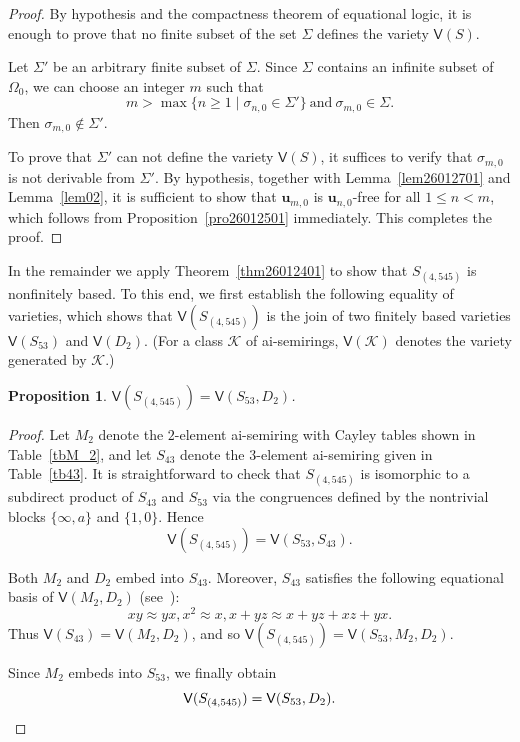 \documentclass[reqno]{amsart}
\theoremstyle{plain}
\newtheorem{pro}[thm]{Proposition}
\theoremstyle{definition}
\newcommand{\bu}{\mathbf{u}}
\begin{document}
\begin{proof}
By hypothesis and the compactness theorem of equational logic,
it is enough to prove that no finite subset of the set $\Sigma$ defines the variety $\mathsf{V}(S)$.

Let $\Sigma'$ be an arbitrary finite subset of $\Sigma$.
Since $\Sigma$ contains an infinite subset of $\Omega_0$, we can choose an integer $m$ such that
\[
m>\max\{n\geq 1 \mid \sigma_{n, 0}\in \Sigma'\}~ \text{and} ~\sigma_{m, 0}\in\Sigma.
\]
Then $\sigma_{m, 0}\notin\Sigma'$.

To prove that $\Sigma'$ can not define the variety $\mathsf{V}(S)$,
it suffices to verify that $\sigma_{m, 0}$ is not derivable from $\Sigma'$.
By hypothesis, together with Lemma~\ref{lem26012701} and Lemma~\ref{lem02},
it is sufficient to show that $\bu_{m, 0}$ is $\bu_{n, 0}$-free for all $1 \leq n<m$,
which follows from Proposition~\ref{pro26012501} immediately.
This completes the proof.
\end{proof}

In the remainder we apply Theorem~\ref{thm26012401} to show that $S_{(4, 545)}$ is nonfinitely based.
To this end, we first establish the following equality of varieties,
which shows that $\mathsf{V}(S_{(4, 545)})$ is the join of two finitely based varieties
$\mathsf{V}(S_{53})$ and $\mathsf{V}(D_2)$.
(For a class $\mathcal{K}$ of ai-semirings,
$\mathsf{V}(\mathcal{K})$ denotes the variety generated by $\mathcal{K}$.)

\begin{pro}\label{pro26011401}
$\mathsf{V}(S_{(4, 545)})=\mathsf{V}(S_{53}, D_2)$.
\end{pro}
\begin{proof}
Let $M_2$ denote the $2$-element ai-semiring with Cayley tables shown in Table~\ref{tbM_2},
and let $S_{43}$ denote the $3$-element ai-semiring given in Table~\ref{tb43}.
It is straightforward to check that $S_{(4, 545)}$ is isomorphic to a subdirect product of $S_{43}$ and $S_{53}$
via the congruences defined by the nontrivial blocks $\{\infty, a\}$ and $\{1, 0\}$.
Hence
\[
\mathsf{V}(S_{(4, 545)}) = \mathsf{V}(S_{53}, S_{43}).
\]

Both $M_2$ and $D_2$ embed into $S_{43}$.
Moreover, $S_{43}$ satisfies the following equational basis of $\mathsf{V}(M_2, D_2)$ (see~\cite{sr}):
\[
xy \approx yx, x^2 \approx x, x+yz \approx x+yz+xz+yx.
\]
Thus $\mathsf{V}(S_{43})=\mathsf{V}(M_2, D_2)$,
and so $\mathsf{V}(S_{(4, 545)})=\mathsf{V}(S_{53}, M_2, D_2)$.

Since $M_2$ embeds into $S_{53}$,
we finally obtain
\[
\mathsf{V}(S_{(4, 545)})=\mathsf{V}(S_{53}, D_2).\qedhere
\]
\end{proof}
\end{document}
